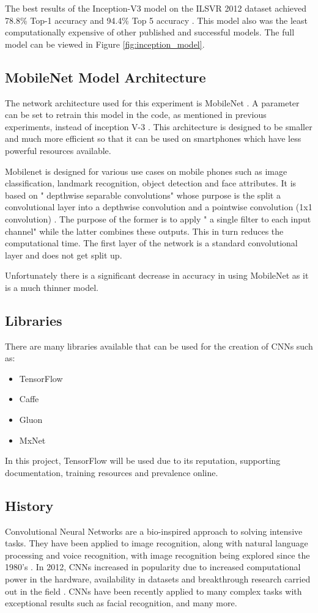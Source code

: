 The best results of the Inception-V3 model on the ILSVR 2012 dataset achieved 78.8\% Top-1 accuracy and 94.4\% Top 5 accuracy \parencite{rethinkingInception}.
This model also was the least computationally expensive of other published and successful models.
The full model can be viewed in Figure \ref{fig:inception_model}.

\subsection*{MobileNet Model Architecture}
The network architecture used for this experiment is MobileNet \parencite{mobilenet}.
A parameter can be set to retrain this model in the code, as mentioned in previous experiments, instead of inception V-3 \parencite{retrainInception}. 
This architecture is designed to be smaller and much more efficient so that
it can be used on smartphones which have less powerful resources available.

Mobilenet is designed for various use cases on mobile phones such as image classification, landmark recognition, object detection and face attributes.
It is based on " depthwise separable convolutions" whose purpose is the split a convolutional layer into a depthwise convolution and a pointwise convolution (1x1 convolution) \parencite{mobilenet}.
The purpose of the former is to apply " a single filter to each input channel" \parencite{mobilenet} while the latter combines these outputs.
This in turn reduces the computational time.
The first layer of the network is a standard convolutional layer and does not get split up.

Unfortunately there is a significant decrease in accuracy in using MobileNet as it is a much thinner model.

\subsection*{Libraries}
There are many libraries available that can be used for the creation of CNNs such as:
\begin{itemize}
    \item{TensorFlow}
    \item{Caffe}
    \item{Gluon}
    \item{MxNet}
\end{itemize}
In this project, TensorFlow will be used due to its reputation, supporting documentation, training resources and prevalence online.

\subsection*{History}
Convolutional Neural Networks are a bio-inspired approach to solving intensive tasks.
They have been applied to image recognition, along with natural language processing and voice recognition, with image recognition being explored since the 1980's \parencite{handsOnML}.
In 2012, CNNs increased in popularity due to increased computational power in the hardware, availability in datasets and breakthrough research carried out in the field \parencite{krizhevsky2012imagenet}.
CNNs have been recently applied to many complex tasks with exceptional results such as facial recognition, and many more.